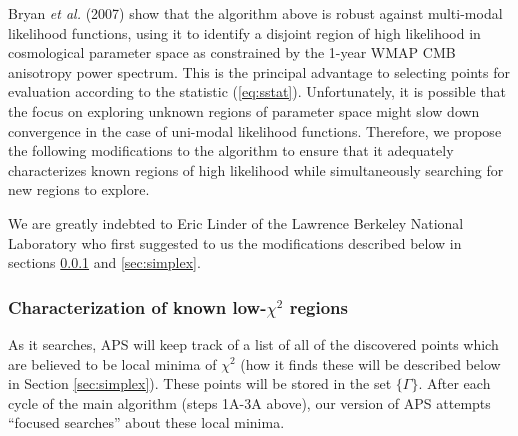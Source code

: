 \documentclass[useAMS,usenatbib]{aastex}
\begin{document}
Bryan {\it et al.} (2007) show that the algorithm above 
is robust against multi-modal
likelihood functions, using it to identify a disjoint region of high likelihood in
cosmological parameter space as constrained by the 1-year WMAP CMB anisotropy power
spectrum.  This is the principal advantage to selecting points for evaluation according
to the statistic (\ref{eq:sstat}).  Unfortunately, it is possible that the focus on exploring
unknown regions of parameter space might slow down convergence in the case of uni-modal
likelihood functions.  Therefore, we propose the following modifications to the algorithm
to ensure that it adequately characterizes known regions of high likelihood while
simultaneously searching for new regions to explore.

We are greatly indebted to Eric Linder of the Lawrence Berkeley National
Laboratory who first suggested to us the modifications described below
in sections \ref{sec:focus} and \ref{sec:simplex}.

\subsubsection{Characterization of known low-$\chi^2$ regions}
\label{sec:focus}

As it searches, APS will keep track of a list of all of the discovered points
which are believed to be local minima of $\chi^2$ (how it finds these will be described below
in Section \ref{sec:simplex}).  These points will be stored in the set
$\{\Gamma\}$.  After each cycle of the main algorithm (steps 1A-3A above),
our version of APS attempts ``focused searches'' about these local minima.  
\end{document}
